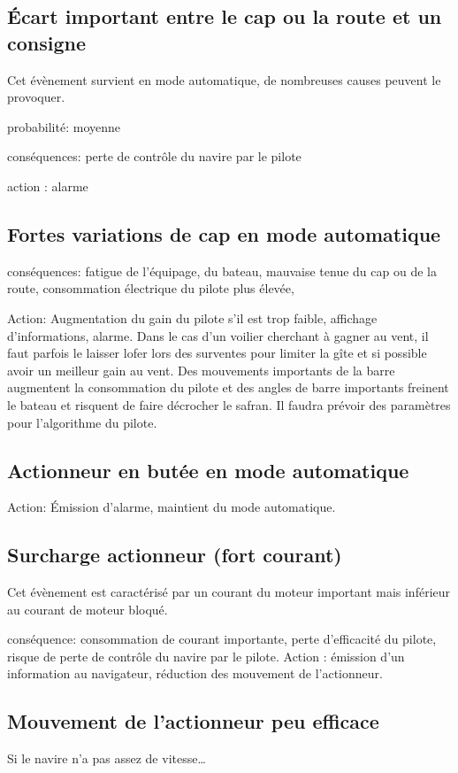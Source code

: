 \documentclass[a4paper,11pt]{report}
\begin{document}
\subsection{Écart important entre le cap ou la route et un consigne}
Cet évènement survient en mode automatique, de nombreuses causes peuvent le provoquer.

probabilité: moyenne

conséquences: perte de contrôle du navire par le pilote

action : alarme

\subsection{Fortes variations de cap en mode automatique}

conséquences: fatigue de l'équipage, du bateau, mauvaise tenue du cap ou de la route, consommation électrique du pilote plus élevée, 

Action: Augmentation du gain du pilote s'il est trop faible, affichage d'informations, alarme.
Dans le cas d'un voilier cherchant à gagner au vent, il faut parfois le laisser lofer
lors des surventes pour limiter la gîte et si possible avoir un meilleur gain au vent.
Des mouvements importants de la barre augmentent la consommation du pilote
et des angles de barre importants freinent le bateau et risquent de faire décrocher
le safran. Il faudra prévoir des paramètres pour l'algorithme du pilote.

\subsection{Actionneur en butée en mode automatique}

Action: Émission d'alarme, maintient du mode automatique.

\subsection{Surcharge actionneur (fort courant)}
Cet évènement est caractérisé par un courant du moteur important mais inférieur
au courant de moteur bloqué.

conséquence: consommation de courant importante, perte d'efficacité du pilote, risque de perte de contrôle du navire par le pilote.
Action : émission d'un information au navigateur, réduction des mouvement de l'actionneur.

\subsection{Mouvement de l'actionneur peu efficace}
Si le navire n'a pas assez de vitesse\dots
\end{document}
